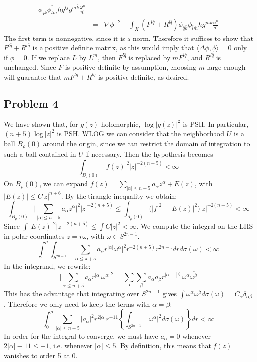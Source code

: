 \documentclass[12 pt]{article}
\theoremstyle{plain}
\theoremstyle{definition}
\theoremstyle{remark}
\begin{document}
\begin{enumerate}[(a)]
\begin{align*}
	\phi_{\bar q \bar k} \overline{\phi_{\bar l \bar m}} h g^{l \bar j} g^{m \bar k} \frac{\omega^n}{n!}	\\
	&= ||\overline{ \nabla} \phi ||^2 +  \int_X (F^{l \bar q} + R^{l \bar q}) 
	\phi_{\bar q \bar k} \overline{\phi_{\bar l \bar m}} h  g^{m \bar k} \frac{\omega^n}{n!}
	\end{align*}
	The first term is nonnegative, since it is a norm. Therefore it suffices to show that $F^{l\bar q} + R^{l \bar q}$ is a positive definite
	matrix, as this would imply that $\langle \Delta \phi, \phi\rangle = 0$ only if $\phi = 0$. If we replace $L$ by $L^m$, then $F^{l\bar q}$
	is replaced by $m F^{l \bar q}$, and $R^{l \bar q}$ is unchanged. Since $F$ is positive definite by assumption, choosing $m$ large
	enough will guarantee that $m F^{l \bar q} + R^{l \bar q}$ is positive definite, as desired.
\end{enumerate}


\subsection*{Problem 4}
We have shown that, for $g(z)$ holomorphic, $\log |g(z)|^2$ is PSH. In particular, $(n+5) \log |z|^2$ is PSH. WLOG we can consider that
the neighborhood $U$ is a ball $B_{\rho}(0)$ around the origin, since we can restrict the domain of integration to such a ball contained in $U$
if necessary. Then the hypothesis becomes:
\[              \int_{B_{\rho}(0)} |f(z)|^2 |z|^{-2(n+5)} < \infty      \]
On $B_{\rho}(0)$, we can expand $f(z) = \sum_{|\alpha|\leq n+5} a_{\alpha} z^{\alpha} + E(z)$, with $|E(z)| \leq C |z|^{n+6}$. By the
tirangle inequality we obtain:
\[        \int_{B_{\rho}(0)} \big| \sum_{|\alpha| \leq n+5} a_{\alpha} z^{\alpha}  \big|^2   |z|^{-2(n+5)} \leq \int_{B_{\rho}(0)} \big( |f|^2 
+ |E(z)|^2 \big)  |z|^{-2(n+5)} < \infty     \]
Since $\int |E(z)|^2 |z|^{-2(n+5)} \leq \int C |z|^2 < \infty$. We compute the integral on the LHS in polar coordinates $z = r \omega$, with
$\omega \in S^{2n-1}$.
\[      \int_0^{\rho} \int_{S^{2n-1}} \big| \sum_{\alpha \leq n+5} a_{\alpha} r^{|\alpha|} \omega^{\alpha}  \big|^2  r^{-2(n+5)} r^{2n-1}
dr d\sigma(\omega) < \infty    \]
In the integrand, we rewrite:
\[ \big| \sum_{\alpha \leq n+5} a_{\alpha} r^{|\alpha|} \omega^{\alpha}  \big|^2 = \sum_{\alpha} \sum_{\beta} a_{\alpha} \bar a_{\beta}
r^{|\alpha| + |\beta|} \omega^{\alpha} \overline{\omega^{\beta}} \]
This has the advantage that integrating over $S^{2n-1}$ gives $\int \omega^{\alpha}  \overline{\omega^{\beta}} d\sigma(\omega) =
C_{\alpha} \delta_{\alpha \beta}$. Therefore we only need to keep the terms with $\alpha = \beta$:
\[       \int_0^{\rho} \sum_{|\alpha|\leq n+5} |a_{\alpha}|^2 r^{2|\alpha|} r^{-11} \left\{ \int_{S^{2n-1}} |\omega^{\alpha}|^2 d\sigma 
(\omega)  \right\} dr < \infty    \]
In order for the integral to converge, we must have $a_{\alpha} = 0$ whenever $2|\alpha| - 11 \leq -1$, i.e. whenever $|\alpha| \leq 5$. By
definition, this means that $f(z)$ vanishes to order 5 at 0.
\end{document}
